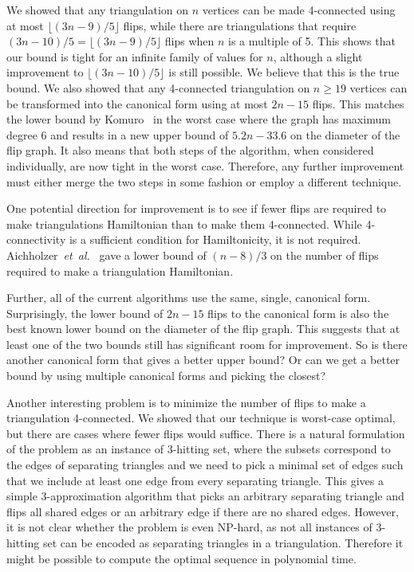\pdfoutput=1 \documentclass[12pt]{elsarticle}
\newcommand{\etal}{\emph{et~al.}\xspace}
\begin{document}
\noindent We showed that any triangulation on $n$ vertices can be made 4-connected using at most $\lfloor (3n - 9)/5 \rfloor$ flips, while there are triangulations that require $(3n - 10)/5 = \lfloor (3n - 9)/5 \rfloor$ flips when $n$ is a multiple of 5. This shows that our bound is tight for an infinite family of values for $n$, although a slight improvement to $\lfloor (3n - 10)/5 \rfloor$ is still possible. We believe that this is the true bound. We also showed that any 4-connected triangulation on $n \geq 19$ vertices can be transformed into the canonical form using at most $2n - 15$ flips. This matches the lower bound by Komuro~\cite{komuro1997diagonal} in the worst case where the graph has maximum degree 6 and results in a new upper bound of $5.2 n - 33.6$ on the diameter of the flip graph. It also means that both steps of the algorithm, when considered individually, are now tight in the worst case. Therefore, any further improvement must either merge the two steps in some fashion or employ a different technique.

One potential direction for improvement is to see if fewer flips are required to make triangulations Hamiltonian than to make them 4-connected. While 4-connectivity is a sufficient condition for Hamiltonicity, it is not required. Aichholzer~\etal~\cite{oswin08} gave a lower bound of $(n - 8)/3$ on the number of flips required to make a triangulation Hamiltonian.

Further, all of the current algorithms use the same, single, canonical form. Surprisingly, the lower bound of $2n - 15$ flips to the canonical form is also the best known lower bound on the diameter of the flip graph. This suggests that at least one of the two bounds still has significant room for improvement. So is there another canonical form that gives a better upper bound? Or can we get a better bound by using multiple canonical forms and picking the closest?

Another interesting problem is to minimize the number of flips to make a triangulation 4-connected. We showed that our technique is worst-case optimal, but there are cases where fewer flips would suffice. There is a natural formulation of the problem as an instance of 3-hitting set, where the subsets correspond to the edges of separating triangles and we need to pick a minimal set of edges such that we include at least one edge from every separating triangle. This gives a simple 3-approximation algorithm that picks an arbitrary separating triangle and flips all shared edges or an arbitrary edge if there are no shared edges. However, it is not clear whether the problem is even NP-hard, as not all instances of 3-hitting set can be encoded as separating triangles in a triangulation. Therefore it might be possible to compute the optimal sequence in polynomial time.











\end{document}
